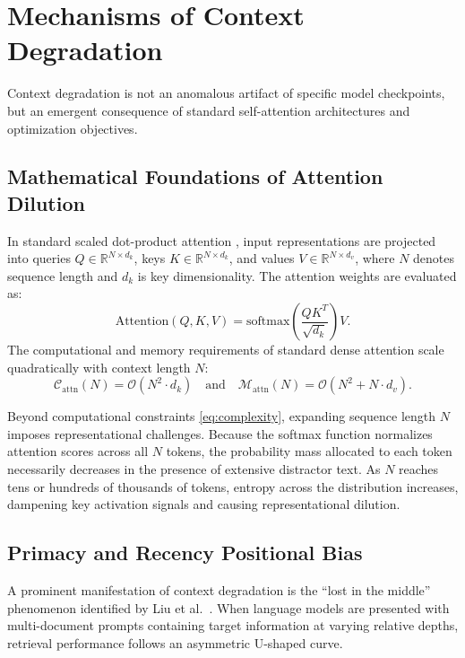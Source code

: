 \documentclass[manuscript]{acmart}
\begin{document}
\section{Mechanisms of Context Degradation}\label{sec:mechanisms}
Context degradation is not an anomalous artifact of specific model checkpoints, but an emergent consequence of standard self-attention architectures and optimization objectives.

\subsection{Mathematical Foundations of Attention Dilution}
In standard scaled dot-product attention \cite{vaswani2017attention}, input representations are projected into queries $Q \in \mathbb{R}^{N \times d_k}$, keys $K \in \mathbb{R}^{N \times d_k}$, and values $V \in \mathbb{R}^{N \times d_v}$, where $N$ denotes sequence length and $d_k$ is key dimensionality. The attention weights are evaluated as:
\begin{equation}
    \mathrm{Attention}(Q, K, V) = \mathrm{softmax}\left(\frac{QK^T}{\sqrt{d_k}}\right)V.
    \label{eq:attention}
\end{equation}
The computational and memory requirements of standard dense attention scale quadratically with context length $N$:
\begin{equation}
    \mathcal{C}_{\mathrm{attn}}(N) = \mathcal{O}(N^2 \cdot d_k) \quad \text{and} \quad \mathcal{M}_{\mathrm{attn}}(N) = \mathcal{O}(N^2 + N \cdot d_v).
    \label{eq:complexity}
\end{equation}

Beyond computational constraints \eqref{eq:complexity}, expanding sequence length $N$ imposes representational challenges. Because the softmax function normalizes attention scores across all $N$ tokens, the probability mass allocated to each token necessarily decreases in the presence of extensive distractor text. As $N$ reaches tens or hundreds of thousands of tokens, entropy across the distribution increases, dampening key activation signals and causing representational dilution.

\subsection{Primacy and Recency Positional Bias}
A prominent manifestation of context degradation is the ``lost in the middle'' phenomenon identified by Liu et al.~\cite{liu2024lost}. When language models are presented with multi-document prompts containing target information at varying relative depths, retrieval performance follows an asymmetric U-shaped curve. 
\end{document}
